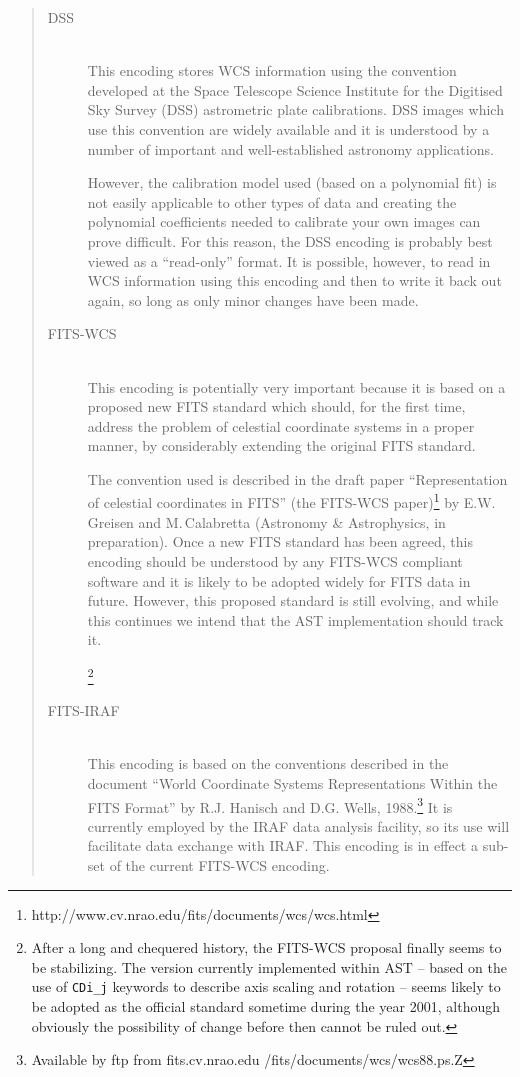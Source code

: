 \documentclass[twoside,11pt]{article}
\newcommand{\htmladdnormallinkfoot}[2]{#1\footnote{#2}}
\begin{document}
\begin{quote}
\begin{description}
\item[DSS]\mbox{}\\
This encoding stores WCS information using the convention developed at
the Space Telescope Science Institute for the Digitised Sky Survey
(DSS) astrometric plate calibrations.  DSS images which use this
convention are widely available and it is understood by a number of
important and well-established astronomy applications.

However, the calibration model used (based on a polynomial fit) is not
easily applicable to other types of data and creating the polynomial
coefficients needed to calibrate your own images can prove
difficult. For this reason, the DSS encoding is probably best viewed
as a ``read-only'' format. It is possible, however, to read in WCS
information using this encoding and then to write it back out again,
so long as only minor changes have been made.

\item[FITS-WCS]\mbox{}\\
This encoding is potentially very important because it is based on a
proposed new FITS standard which should, for the first time, address
the problem of celestial coordinate systems in a proper manner, by
considerably extending the original FITS standard.

The convention used is described in the draft paper ``Representation
of celestial coordinates in FITS'' \htmladdnormallinkfoot{(the
FITS-WCS paper)}{http://www.cv.nrao.edu/fits/documents/wcs/wcs.html}
by E.W.\,Greisen and M.\,Calabretta (Astronomy \& Astrophysics, in
preparation). Once a new FITS standard has been agreed, this encoding
should be understood by any FITS-WCS compliant software and it is
likely to be adopted widely for FITS data in future.  However, this
proposed standard is still evolving, and while this continues we
intend that the AST implementation should track it.

\footnote{After a long and chequered history, the FITS-WCS proposal 
finally seems to be stabilizing. The version currently implemented within
AST -- based on the use of {\tt CDi\_j} keywords to describe axis scaling
and rotation -- seems likely to be adopted as the official standard
sometime during the year 2001, although obviously the possibility of
change before then cannot be ruled out.}

\item[FITS-IRAF]\mbox{}\\
This encoding is based on the conventions described in the document
``World Coordinate Systems Representations Within the FITS Format'' by R.J.
Hanisch and D.G. Wells, 1988.\footnote{Available by ftp from
fits.cv.nrao.edu /fits/documents/wcs/wcs88.ps.Z} It is currently employed
by the IRAF data analysis facility, so its use will facilitate data
exchange with IRAF. This encoding is in effect a sub-set of the current
FITS-WCS encoding.


\end{description}
\end{quote}
\end{document}
